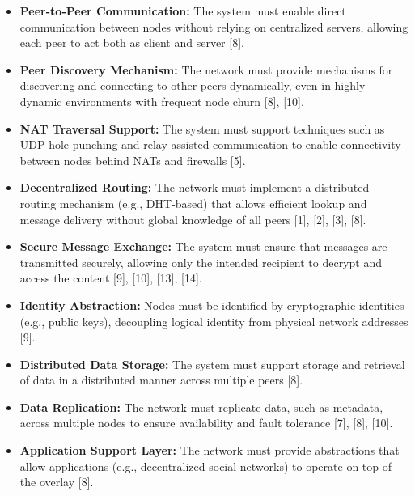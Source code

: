 \documentclass[12pt,a4paper]{article}
\begin{document}
\begin{itemize}

\item \textbf{Peer-to-Peer Communication:}  
The system must enable direct communication between nodes without relying on centralized servers, allowing each peer to act both as client and server [8].

\item \textbf{Peer Discovery Mechanism:}  
The network must provide mechanisms for discovering and connecting to other peers dynamically, even in highly dynamic environments with frequent node churn [8], [10].

\item \textbf{NAT Traversal Support:}  
The system must support techniques such as UDP hole punching and relay-assisted communication to enable connectivity between nodes behind NATs and firewalls [5].

\item \textbf{Decentralized Routing:}  
The network must implement a distributed routing mechanism (e.g., DHT-based) that allows efficient lookup and message delivery without global knowledge of all peers [1], [2], [3], [8].

\item \textbf{Secure Message Exchange:}  
The system must ensure that messages are transmitted securely, allowing only the intended recipient to decrypt and access the content [9], [10], [13], [14].

\item \textbf{Identity Abstraction:}  
Nodes must be identified by cryptographic identities (e.g., public keys), decoupling logical identity from physical network addresses [9].

\item \textbf{Distributed Data Storage:}  
The system must support storage and retrieval of data in a distributed manner across multiple peers [8].

\item \textbf{Data Replication:}  
The network must replicate data, such as metadata, across multiple nodes to ensure availability and fault tolerance [7], [8], [10].

\item \textbf{Application Support Layer:}  
The network must provide abstractions that allow applications (e.g., decentralized social networks) to operate on top of the overlay [8].

\end{itemize}
\end{document}
